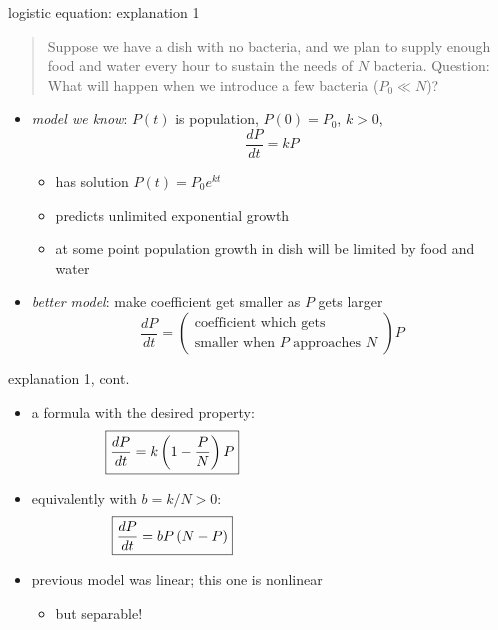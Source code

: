 \documentclass[colorlinks]{beamer}
\begin{document}
\begin{frame}{logistic equation: explanation 1}

\small
\begin{quotation}
\noindent Suppose we have a dish with no bacteria, and we plan to supply enough food and water every hour to sustain the needs of $N$ bacteria.  Question: What will happen when we introduce a few bacteria ($P_0 \ll N$)?
\end{quotation}

\normalsize
\begin{itemize}
\item \emph{model we know}:  $P(t)$ is population, $P(0)=P_0$, $k>0$,
    $$\frac{dP}{dt} = k P$$

\vspace{-2mm}
    \begin{itemize}
    \item has solution $P(t) = P_0 e^{kt}$
    \item predicts unlimited exponential growth
    \item at some point population growth in dish will be limited by food and water
    \end{itemize}
\item \emph{better model}: make coefficient get smaller as $P$ gets larger
    $$\frac{dP}{dt} = \left(\begin{matrix} \text{coefficient which gets} \\ \text{smaller when $P$ approaches $N$}\end{matrix} \right) P$$
\end{itemize}
\end{frame}


\begin{frame}{explanation 1, cont.}

\begin{itemize}
\item a formula with the desired property:
    $$\boxed{\frac{dP}{dt} = k \left(1-\frac{P}{N}\right) P} \hspace{50mm}$$
\item equivalently with $b=k/N >0$:
    $$\boxed{\frac{dP}{dt} = b P \left(N-P\right)} \hspace{50mm}$$
\item previous model was linear; this one is nonlinear
     \begin{itemize}
     \item but separable!
     \end{itemize}
\end{itemize}
\end{frame}
\end{document}
